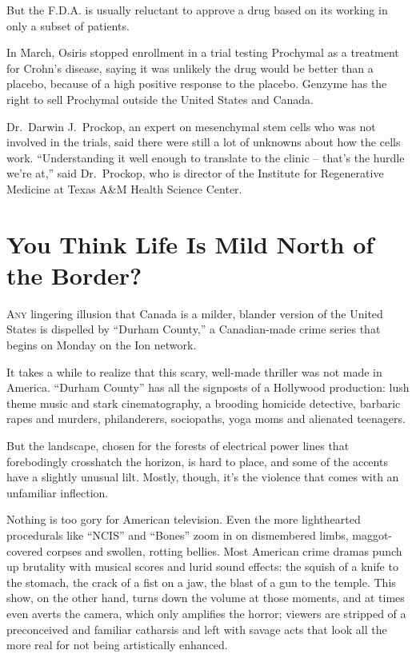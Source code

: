 ﻿\documentclass[12pt]{article}
\begin{document}
But the F.D.A. is usually reluctant to approve a drug based on its working in only a subset of
patients.

In March, Osiris stopped enrollment in a trial testing Prochymal as a treatment for Crohn's disease,
saying it was unlikely the drug would be better than a placebo, because of a high positive response
to the placebo. Genzyme has the right to sell Prochymal outside the United States and Canada.

Dr.~Darwin J.~Prockop, an expert on mesenchymal stem cells who was not involved in the trials, said
there were still a lot of unknowns about how the cells work. ``Understanding it well enough to
translate to the clinic -- that's the hurdle we're at,'' said Dr.~Prockop, who is director of the
Institute for Regenerative Medicine at Texas A\&M Health Science Center.

\section{You Think Life Is Mild North of the Border?}

\lettrine{A}{ny} lingering illusion that Canada is a milder, blander\cite{bland} version of the
United States is dispelled by ``Durham County,'' a Canadian-made crime series that begins on Monday
on the Ion network.

It takes a while to realize that this scary, well-made thriller was not made in America. ``Durham
County'' has all the signposts of a Hollywood production: lush theme music and stark cinematography,
a brooding homicide detective, barbaric rapes and murders, philanderers, sociopaths, yoga moms and
alienated teenagers.

But the landscape, chosen for the forests of electrical power lines that forebodingly crosshatch the
horizon, is hard to place, and some of the accents have a slightly unusual lilt. Mostly, though,
it's the violence that comes with an unfamiliar inflection.

Nothing is too gory for American television. Even the more lighthearted procedurals like ``NCIS''
and ``Bones'' zoom in on dismembered limbs, maggot-covered corpses and swollen, rotting bellies.
Most American crime dramas punch up brutality with musical scores and lurid sound effects: the
squish of a knife to the stomach, the crack of a fist on a jaw, the blast of a gun to the temple.
This show, on the other hand, turns down the volume at those moments, and at times even averts the
camera, which only amplifies the horror; viewers are stripped of a preconceived and familiar
catharsis and left with savage acts that look all the more real for not being artistically enhanced.
\end{document}
